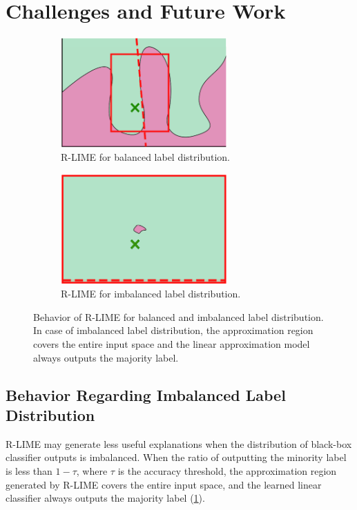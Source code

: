 \documentclass[runningheads]{llncs}
\begin{document}
\section{Challenges and Future Work}
 {%
  \def\imgwidth{0.47\textwidth}
  \begin{figure}[t]
    \centering
    \begin{subfigure}[t]{\imgwidth}
      \centering
      \includegraphics[width=0.7\textwidth]{visual-rlime3}
      \caption{R-LIME for balanced label distribution.}
    \end{subfigure}
    \begin{subfigure}[t]{\imgwidth}
      \centering
      \includegraphics[width=0.7\textwidth]{visual-rlime-imbalanced}
      \caption{R-LIME for imbalanced label distribution.
      }
    \end{subfigure}
    \caption[Behavior of R-LIME for balanced and imbalanced label distribution]{%
      Behavior of R-LIME for balanced and imbalanced label distribution.
      In case of imbalanced label distribution,
      the approximation region covers the entire input space and the
      linear approximation model always outputs the majority label.
    }\label{fig:imbalanced}
  \end{figure}
 }

\subsection{Behavior Regarding Imbalanced Label Distribution}
R-LIME may generate less useful explanations
when the distribution of black-box classifier outputs is imbalanced.
When the ratio of outputting the minority label is less than $1-\tau$,
where $\tau$ is the accuracy threshold,
the approximation region generated by R-LIME covers the entire input space,
and the learned linear classifier always outputs the majority label
(\cref{fig:imbalanced}).
\end{document}
